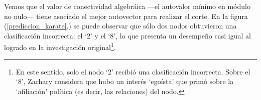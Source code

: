 
\vspace{1em}
Vemos que el valor de conectividad algebráica ---el autovalor mínimo en módulo no nulo--- tiene asociado el mejor autovector para realizar el corte. En la figura (\ref{prediccion_karate}.) se puede observar que sólo dos nodos obtuvieron una clasificación incorrecta: el `2' y el `8', lo que presenta un desempeño casi igual al logrado en la investigación original\footnote{En este sentido, solo el nodo `2' recibió una clasificación incorrecta. Sobre el `8', Zachary considera \cite{Zachary} que hubo un interés `egoísta' que primó sobre la `afiliación' política (es decir, las relaciones) del nodo.}.

